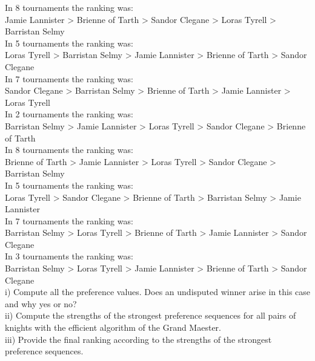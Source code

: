 \documentclass[11pt]{article}
\begin{document}
\noindent In 8 tournaments the ranking was:\\ Jamie Lannister > Brienne of Tarth
> Sandor Clegane > Loras Tyrell > Barristan Selmy\\

\noindent In 5 tournaments the ranking was:\\ Loras Tyrell > Barristan Selmy >
Jamie Lannister > Brienne of Tarth > Sandor Clegane\\

\noindent In 7 tournaments the ranking was:\\ Sandor Clegane > Barristan Selmy >
Brienne of Tarth > Jamie Lannister > Loras Tyrell\\

\noindent In 2 tournaments the ranking was:\\ Barristan Selmy > Jamie Lannister >
Loras Tyrell > Sandor Clegane > Brienne of Tarth\\

\noindent In 8 tournaments the ranking was:\\ Brienne of Tarth > Jamie Lannister >
Loras Tyrell > Sandor Clegane > Barristan Selmy\\

\noindent In 5 tournaments the ranking was:\\ Loras Tyrell > Sandor Clegane >
Brienne of Tarth > Barristan Selmy > Jamie Lannister\\

\noindent In 7 tournaments the ranking was:\\ Barristan Selmy > Loras Tyrell >
Brienne of Tarth > Jamie Lannister > Sandor Clegane\\

\noindent In 3 tournaments the ranking was:\\ Barristan Selmy > Loras Tyrell >
Jamie Lannister > Brienne of Tarth > Sandor Clegane\\

\noindent i) Compute all the preference values. Does an undisputed winner
arise in this case and why yes or no?\\

\noindent ii) Compute the strengths of the strongest preference
sequences for all pairs of knights with the efficient algorithm of the
Grand Maester.\\

\noindent iii) Provide the final ranking according to the strengths of
the strongest preference sequences.\\
\end{document}
